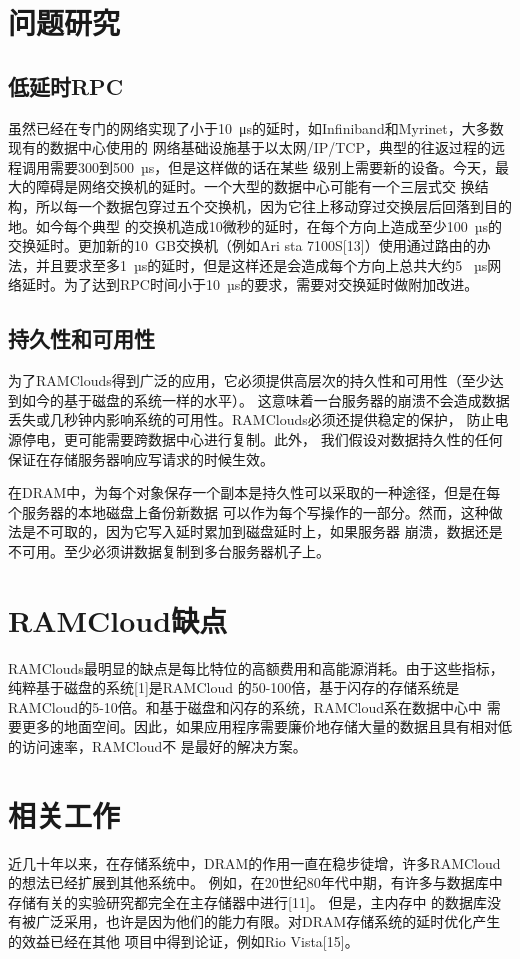 \documentclass[translation]{zjutreport}
\begin{document}
\chapter{问题研究}
\section{低延时RPC}
虽然已经在专门的网络实现了小于10~μs的延时，如Infiniband和Myrinet，大多数现有的数据中心使用的
网络基础设施基于以太网/IP/TCP，典型的往返过程的远程调用需要300到500~µs，但是这样做的话在某些
级别上需要新的设备。今天，最大的障碍是网络交换机的延时。一个大型的数据中心可能有一个三层式交
换结构，所以每一个数据包穿过五个交换机，因为它往上移动穿过交换层后回落到目的地。如今每个典型
的交换机造成10微秒的延时，在每个方向上造成至少100~µs的交换延时。更加新的10~GB交换机（例如Ari
sta 7100S[13]）使用通过路由的办法，并且要求至多1~µs的延时，但是这样还是会造成每个方向上总共大约5
~µs网络延时。为了达到RPC时间小于10~µs的要求，需要对交换延时做附加改进。

\section{持久性和可用性}
为了RAMClouds得到广泛的应用，它必须提供高层次的持久性和可用性（至少达到如今的基于磁盘的系统一样的水平）。
这意味着一台服务器的崩溃不会造成数据丢失或几秒钟内影响系统的可用性。RAMClouds必须还提供稳定的保护，
防止电源停电，更可能需要跨数据中心进行复制。此外，
我们假设对数据持久性的任何保证在存储服务器响应写请求的时候生效。

在DRAM中，为每个对象保存一个副本是持久性可以采取的一种途径，但是在每个服务器的本地磁盘上备份新数据
可以作为每个写操作的一部分。然而，这种做法是不可取的，因为它写入延时累加到磁盘延时上，如果服务器
崩溃，数据还是不可用。至少必须讲数据复制到多台服务器机子上。

\chapter{RAMCloud缺点}
RAMClouds最明显的缺点是每比特位的高额费用和高能源消耗。由于这些指标，纯粹基于磁盘的系统[1]是RAMCloud
的50-100倍，基于闪存的存储系统是RAMCloud的5-10倍。和基于磁盘和闪存的系统，RAMCloud系在数据中心中
需要更多的地面空间。因此，如果应用程序需要廉价地存储大量的数据且具有相对低的访问速率，RAMCloud不
是最好的解决方案。

\chapter{相关工作}
近几十年以来，在存储系统中，DRAM的作用一直在稳步徒增，许多RAMCloud的想法已经扩展到其他系统中。
例如，在20世纪80年代中期，有许多与数据库中存储有关的实验研究都完全在主存储器中进行[11]。
但是，主内存中
的数据库没有被广泛采用，也许是因为他们的能力有限。对DRAM存储系统的延时优化产生的效益已经在其他
项目中得到论证，例如Rio Vista[15]。
\end{document}
